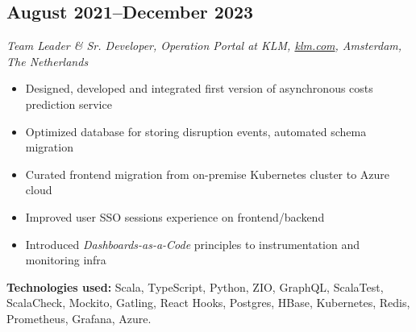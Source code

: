 \subsection*{August 2021--December 2023}

\textit{Team Leader \& Sr. Developer, Operation Portal at KLM, \href{https://klm.com}{\url{klm.com}}, Amsterdam, The Netherlands}

\begin{itemize}[noitemsep]
  \item Designed, developed and integrated first version of asynchronous costs prediction service
  \item Optimized database for storing disruption events, automated schema migration
  \item Curated frontend migration from on-premise Kubernetes cluster to Azure cloud
  \item Improved user SSO sessions experience on frontend/backend
  \item Introduced \textit{Dashboards-as-a-Code} principles to instrumentation and monitoring infra
\end{itemize}

\textbf{Technologies used:}
Scala, TypeScript, Python, ZIO, GraphQL,
ScalaTest, ScalaCheck, Mockito, Gatling, React Hooks, Postgres, HBase, Kubernetes,
Redis, Prometheus, Grafana, Azure.
